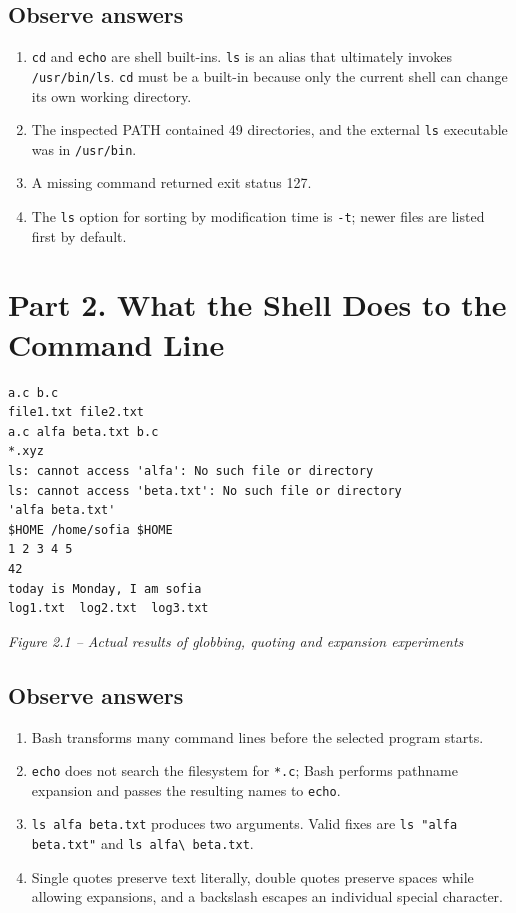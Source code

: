 \documentclass[12pt,a4paper]{article}
\newcommand{\figcap}[1]{\begin{center}\small\textit{#1}\end{center}\vspace{0.4em}}
\begin{document}
\subsection{Observe answers}
\begin{enumerate}[label=\arabic*.]
\item \texttt{cd} and \texttt{echo} are shell built-ins. \texttt{ls} is an alias that ultimately invokes \texttt{/usr/bin/ls}. \texttt{cd} must be a built-in because only the current shell can change its own working directory.
\item The inspected PATH contained 49 directories, and the external \texttt{ls} executable was in \texttt{/usr/bin}.
\item A missing command returned exit status 127.
\item The \texttt{ls} option for sorting by modification time is \texttt{-t}; newer files are listed first by default.
\end{enumerate}

\section{Part 2. What the Shell Does to the Command Line}
\begin{lstlisting}
a.c b.c
file1.txt file2.txt
a.c alfa beta.txt b.c
*.xyz
ls: cannot access 'alfa': No such file or directory
ls: cannot access 'beta.txt': No such file or directory
'alfa beta.txt'
$HOME /home/sofia $HOME
1 2 3 4 5
42
today is Monday, I am sofia
log1.txt  log2.txt  log3.txt
\end{lstlisting}
\figcap{Figure 2.1 -- Actual results of globbing, quoting and expansion experiments}

\subsection{Observe answers}
\begin{enumerate}[label=\arabic*.]
\item Bash transforms many command lines before the selected program starts.
\item \texttt{echo} does not search the filesystem for \texttt{*.c}; Bash performs pathname expansion and passes the resulting names to \texttt{echo}.
\item \texttt{ls alfa beta.txt} produces two arguments. Valid fixes are \texttt{ls "alfa beta.txt"} and \texttt{ls alfa\textbackslash\ beta.txt}.
\item Single quotes preserve text literally, double quotes preserve spaces while allowing expansions, and a backslash escapes an individual special character.
\end{enumerate}
\end{document}
